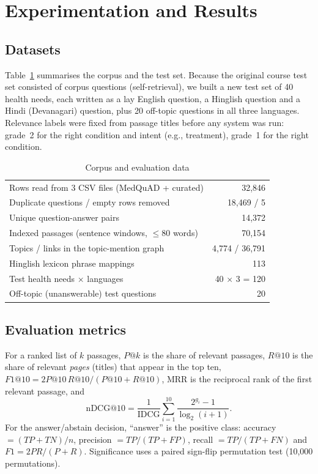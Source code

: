 \documentclass[conference]{IEEEtran}
\begin{document}
\section{Experimentation and Results}
\subsection{Datasets}
Table~\ref{tab:data} summarises the corpus and the test set. Because the original course test set consisted of corpus questions (self-retrieval), we built a new test set of 40 health needs, each written as a lay English question, a Hinglish question and a Hindi (Devanagari) question, plus 20 off-topic questions in all three languages. Relevance labels were fixed from passage titles before any system was run: grade~2 for the right condition and intent (e.g., treatment), grade~1 for the right condition.

\begin{table}[t]
\caption{Corpus and evaluation data}
\label{tab:data}
\centering
\begin{tabular}{@{}lr@{}}
\toprule
Rows read from 3 CSV files (MedQuAD + curated) & 32,846 \\
Duplicate questions / empty rows removed & 18,469 / 5 \\
Unique question-answer pairs & 14,372 \\
Indexed passages (sentence windows, $\leq$80 words) & 70,154 \\
Topics / links in the topic-mention graph & 4,774 / 36,791 \\
Hinglish lexicon phrase mappings & 113 \\
Test health needs $\times$ languages & 40 $\times$ 3 = 120 \\
Off-topic (unanswerable) test questions & 20 \\
\bottomrule
\end{tabular}
\end{table}

\subsection{Evaluation metrics}
For a ranked list of $k$ passages, $P@k$ is the share of relevant passages, $R@10$ is the share of relevant \emph{pages} (titles) that appear in the top ten, $F1@10=2P@10\,R@10/(P@10+R@10)$, MRR is the reciprocal rank of the first relevant passage, and
\begin{equation}
\text{nDCG@}10=\frac{1}{\text{IDCG}}\sum_{i=1}^{10}\frac{2^{g_i}-1}{\log_2(i+1)}.
\end{equation}
For the answer/abstain decision, ``answer'' is the positive class: accuracy $=(TP+TN)/n$, precision $=TP/(TP+FP)$, recall $=TP/(TP+FN)$ and $F1=2PR/(P+R)$. Significance uses a paired sign-flip permutation test (10,000 permutations).
\end{document}
